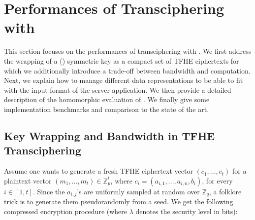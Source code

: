 


\section{Performances of Transciphering with \coolName}
\label{sec:bench}


This section focuses on the performances of transciphering with \coolName. We first address the wrapping of a (\coolName) symmetric key as a compact set of \gls{TFHE} ciphertexts for which we additionally introduce a trade-off between bandwidth and computation. Next, we explain how to manage different data representations to be able to fit with the input format of the server application. We then provide a detailed description of the homomorphic evaluation of \coolName. We finally give some implementation benchmarks and comparison to the state of the art.

\subsection{Key Wrapping and Bandwidth in \gls{TFHE} Transciphering} \label{sec:key_wrapping}

Assume one wants to generate a fresh \gls{TFHE} ciphertext vector $(c_1, \ldots, c_t)$ for a plaintext vector $(m_1, \ldots, m_t) \in \mathbb{Z}_p^t$, where $c_i = (a_{i,1}, \ldots, a_{i,n}, b_i)$, for every $i \in [1,t]$. Since the $a_{i,j}$'s are uniformly sampled at random over $\mathbb{Z}_q$, a folklore trick is to generate them pseudorandomly from a seed. We get the following compressed encryption procedure (where $\lambda$ denotes the security level in bits):
  
\begin{center}
\noindent{}
\end{center}

